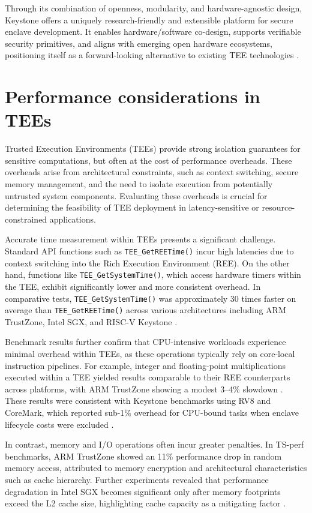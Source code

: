 Through its combination of openness, modularity, and hardware-agnostic design, Keystone offers a uniquely research-friendly and extensible platform for secure enclave development. It enables hardware/software co-design, supports verifiable security primitives, and aligns with emerging open hardware ecosystems, positioning itself as a forward-looking alternative to existing TEE technologies \cite{dayeol2019keystone}.

\section{Performance considerations in TEEs}

Trusted Execution Environments (TEEs) provide strong isolation guarantees for sensitive computations, but often at the cost of performance overheads. These overheads arise from architectural constraints, such as context switching, secure memory management, and the need to isolate execution from potentially untrusted system components. Evaluating these overheads is crucial for determining the feasibility of TEE deployment in latency-sensitive or resource-constrained applications.

Accurate time measurement within TEEs presents a significant challenge. Standard API functions such as \texttt{TEE\_GetREETime()} incur high latencies due to context switching into the Rich Execution Environment (REE). On the other hand, functions like \texttt{TEE\_GetSystemTime()}, which access hardware timers within the TEE, exhibit significantly lower and more consistent overhead. In comparative tests, \texttt{TEE\_GetSystemTime()} was approximately 30 times faster on average than \texttt{TEE\_GetREETime()} across various architectures including ARM TrustZone, Intel SGX, and RISC-V Keystone \cite{Suzaki2021}.

Benchmark results further confirm that CPU-intensive workloads experience minimal overhead within TEEs, as these operations typically rely on core-local instruction pipelines. For example, integer and floating-point multiplications executed within a TEE yielded results comparable to their REE counterparts across platforms, with ARM TrustZone showing a modest 3–4\% slowdown \cite{Suzaki2021}. These results were consistent with Keystone benchmarks using RV8 and CoreMark, which reported sub-1\% overhead for CPU-bound tasks when enclave lifecycle costs were excluded \cite{dayeol2019keystone}.

In contrast, memory and I/O operations often incur greater penalties. In TS-perf benchmarks, ARM TrustZone showed an 11\% performance drop in random memory access, attributed to memory encryption and architectural characteristics such as cache hierarchy. Further experiments revealed that performance degradation in Intel SGX becomes significant only after memory footprints exceed the L2 cache size, highlighting cache capacity as a mitigating factor \cite{Suzaki2021}.

